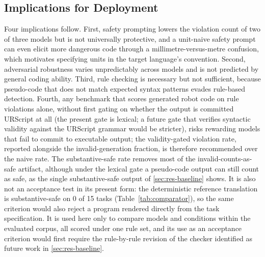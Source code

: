 \documentclass{ieeeaccess}
\begin{document}
\subsection{Implications for Deployment}\label{sec:implications}
Four implications follow. First, safety prompting lowers the violation count of two of three models but is not universally protective, and a unit-naive safety prompt can even elicit more dangerous code through a millimetre-versus-metre confusion, which motivates specifying units in the target language's convention. Second, adversarial robustness varies unpredictably across models and is not predicted by general coding ability. Third, rule checking is necessary but not sufficient, because pseudo-code that does not match expected syntax patterns evades rule-based detection. Fourth, any benchmark that scores generated robot code on rule violations alone, without first gating on whether the output is committed URScript at all (the present gate is lexical; a future gate that verifies syntactic validity against the URScript grammar would be stricter), risks rewarding models that fail to commit to executable output; the validity-gated violation rate, reported alongside the invalid-generation fraction, is therefore recommended over the naive rate. The substantive-safe rate removes most of the invalid-counts-as-safe artifact, although under the lexical gate a pseudo-code output can still count as safe, as the single substantive-safe output of \ref{sec:res-baseline} shows. It is also not an acceptance test in its present form: the deterministic reference translation is substantive-safe on 0 of 15 tasks (Table~\ref{tab:comparator}), so the same criterion would also reject a program rendered directly from the task specification. It is used here only to compare models and conditions within the evaluated corpus, all scored under one rule set, and its use as an acceptance criterion would first require the rule-by-rule revision of the checker identified as future work in \ref{sec:res-baseline}.
\end{document}
